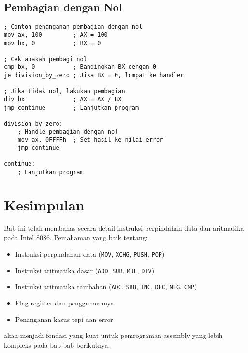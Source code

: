 \documentclass[../main.tex]{subfiles}
\begin{document}
        \subsection{Pembagian dengan Nol}
            \begin{lstlisting}[language={[x86masm]Assembler}, caption=Penanganan Pembagian dengan Nol, label={lst:div-zero-handling}]
; Contoh penanganan pembagian dengan nol
mov ax, 100         ; AX = 100
mov bx, 0           ; BX = 0

; Cek apakah pembagi nol
cmp bx, 0           ; Bandingkan BX dengan 0
je division_by_zero ; Jika BX = 0, lompat ke handler

; Jika tidak nol, lakukan pembagian
div bx              ; AX = AX / BX
jmp continue        ; Lanjutkan program

division_by_zero:
    ; Handle pembagian dengan nol
    mov ax, 0FFFFh  ; Set hasil ke nilai error
    jmp continue

continue:
    ; Lanjutkan program
            \end{lstlisting}

    \section{Kesimpulan}
        Bab ini telah membahas secara detail instruksi perpindahan data dan aritmatika pada Intel 8086. Pemahaman yang baik tentang:
        \begin{itemize}
            \item Instruksi perpindahan data (\texttt{MOV}, \texttt{XCHG}, \texttt{PUSH}, \texttt{POP})
            \item Instruksi aritmatika dasar (\texttt{ADD}, \texttt{SUB}, \texttt{MUL}, \texttt{DIV})
            \item Instruksi aritmatika tambahan (\texttt{ADC}, \texttt{SBB}, \texttt{INC}, \texttt{DEC}, \texttt{NEG}, \texttt{CMP})
            \item Flag register dan penggunaannya
            \item Penanganan kasus tepi dan error
        \end{itemize}

akan menjadi fondasi yang kuat untuk pemrograman assembly yang lebih kompleks pada bab-bab berikutnya.
\end{document}
